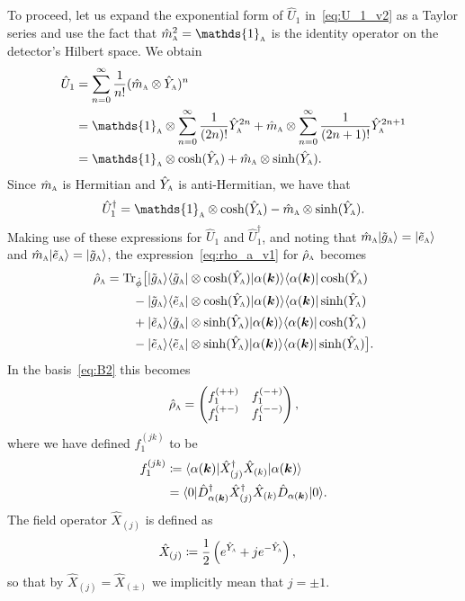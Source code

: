 \documentclass[pra,nofootinbib,floats,aps,twocolumn,tightenlines,superscriptaddress]{revtex4-1}
\newcommand{\ket}[1]{| {#1} \rangle}
\newcommand{\bra}[1]{\langle {#1} |}
\newcommand{\tr}{\text{Tr}}
\newcommand{\rhoa}{\hat{\rho}_\textsc{a}}
\newcommand{\ma}{\hat{m}_\textsc{a}}
\newcommand{\Ya}{\hat{Y}_\textsc{a}}
\newcommand{\gak}{\ket{\tilde{g}_\textsc{a}}}
\newcommand{\eak}{\ket{\tilde{e}_\textsc{a}}}
\newcommand{\gab}{\bra{\tilde{g}_\textsc{a}}}
\newcommand{\eab}{\bra{\tilde{e}_\textsc{a}}}
\newcommand{\alphak}{\ket{\alpha(\bm k)}}
\newcommand{\alphab}{\bra{\alpha(\bm k)}}
\newcommand{\disp}{\hat{D}_{\alpha(\bm{k})}}
\begin{document}
To proceed, let us expand the exponential form of $\hat{U}_1$ in~\eqref{eq:U_1_v2} as a Taylor series and use the fact that $\ma^2=\mathds{1}_\textsc{a}$ is the identity operator on the detector's Hilbert space. We obtain
\begin{align}
    \hat{U}_1
    &=
    \sum_{n=0}^\infty
    \frac{1}{n!}
    (\ma\otimes\Ya)^n
    \notag\\
    &=
    \mathds{1}_\textsc{a}
    \otimes
    \sum_{n=0}^\infty
    \frac{1}{(2n)!}
    \Ya^{2n}
    +
    \ma
    \otimes
    \sum_{n=0}^\infty
    \frac{1}{(2n+1)!}
    \Ya^{2n+1}
    \notag\\
    &=
    \mathds{1}_\textsc{a}
    \otimes
    \cosh(\Ya)
    +
    \ma
    \otimes
    \sinh(\Ya).
\end{align}
Since $\ma$ is Hermitian and $\Ya$ is anti-Hermitian, we have that
\begin{equation}
    \hat{U}_1^\dagger
    =
    \mathds{1}_\textsc{a}
    \otimes
    \cosh(\Ya)
    -
    \ma
    \otimes
    \sinh(\Ya).
\end{equation}
Making use of these expressions for $\hat{U}_1$ and $\hat{U}_1^\dagger$, and noting that $\ma\gak=\eak$ and $\ma\eak=\gak$, the expression~\eqref{eq:rho_a_v1} for $\rhoa$ becomes
\begin{align}
\label{eq:rho_a_v2}
    \rhoa
    &=
    \tr_{\hat{\phi}}
    \big[
    \gak \gab \otimes
    \cosh(\Ya)\alphak\alphab\cosh(\Ya)
    \notag\\
    &\hspace{2.1em}-
    \gak \eab \otimes
    \cosh(\Ya)\alphak\alphab\sinh(\Ya)
    \notag\\
    &\hspace{2.1em}+
    \eak \gab \otimes
    \sinh(\Ya)\alphak\alphab\cosh(\Ya)
    \notag\\
    &\hspace{2.1em}-
    \eak \eab \otimes
    \sinh(\Ya)\alphak\alphab\sinh(\Ya)
    \big].
\end{align}
In the basis~\eqref{eq:B2} this becomes
\begin{equation}
\label{eq:rho_a_v3}
    \rhoa
    =
    \begin{pmatrix}
    f_1^{(++)} & f_1^{(-+)} \\
    f_1^{(+-)} & f_1^{(--)}
    \end{pmatrix},
\end{equation}
where we have defined $f_1^{(jk)}$ to be
\begin{align}
\label{eq:f}
    f_1^{(jk)}
    &\coloneqq
    \alphab
    \hat{X}_{(j)}^\dagger
    \hat{X}_{(k)}
    \alphak
    \notag\\
    &=
    \bra{0}\disp^\dagger
    \hat{X}_{(j)}^\dagger
    \hat{X}_{(k)}
    \disp\ket{0}.
\end{align}
The field operator $\hat{X}_{(j)}$ is defined as
\begin{align}
    \hat{X}_{(j)}
    &\coloneqq
    \frac{1}{2}
    \left(e^{\Ya}+je^{-\Ya}\right),
\end{align}
so that by $\hat{X}_{(j)}=\hat{X}_{(\pm)}$ we implicitly mean that $j=\pm 1$.
\end{document}
